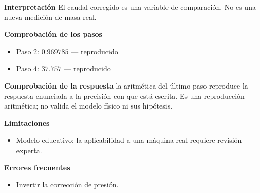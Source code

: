 \documentclass[10pt,openany]{book}
\begin{document}
\begin{tcolorbox}[title={Problema resuelto 4}, studiumworked, breakable]
\noindent\textbf{Interpretación}
El caudal corregido es una variable de comparación. No es una nueva medición de masa real.

\noindent\textbf{Comprobación de los pasos}
\begin{itemize}
\item Paso 2: $0.969785$ — reproducido
\item Paso 4: $37.757$ — reproducido
\end{itemize}

\noindent\textbf{Comprobación de la respuesta} la aritmética del último paso reproduce la respuesta enunciada a la precisión con que está escrita. Es una reproducción aritmética; no valida el modelo físico ni sus hipótesis.

\noindent\textbf{Limitaciones}
\begin{itemize}
\item Modelo educativo; la aplicabilidad a una máquina real requiere revisión experta.
\end{itemize}

\noindent\textbf{Errores frecuentes}
\begin{itemize}
\item Invertir la corrección de presión.
\end{itemize}
\end{tcolorbox}
\end{document}
